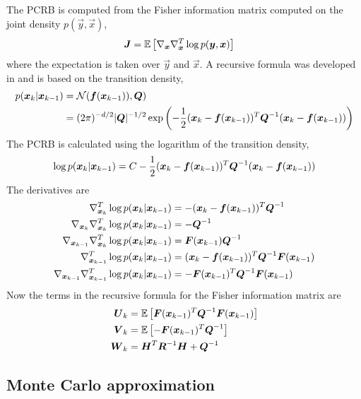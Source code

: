 \documentclass{article}
\begin{document}
The PCRB is computed from the Fisher information matrix computed on the joint density $p(\vec y,\vec x)$,
\begin{align}
	\boldsymbol{J} &= \mathbb E\left[ \nabla_{{\boldsymbol x}}\nabla_{{\boldsymbol x}}^T \log p({\boldsymbol y},{\boldsymbol x}) \right]
\end{align}
where the expectation is taken over $\vec y$ and $\vec x$. A recursive formula was developed in \cite{Tichavsky1998} and is based on the transition density,
\begin{align}
	p({\boldsymbol x}_k|{\boldsymbol x}_{k-1}) &= \mathcal N({\boldsymbol f}({\boldsymbol x}_{k-1})),\boldsymbol{Q}) \\
	&= (2\pi)^{-d/2} |\boldsymbol{Q}|^{-1/2} \exp\left(-\frac{1}{2}({\boldsymbol x}_k - {\boldsymbol f}({\boldsymbol x}_{k-1}))^T \boldsymbol{Q}^{-1} ({\boldsymbol x}_k - {\boldsymbol f}({\boldsymbol x}_{k-1})) \right)
\end{align}
The PCRB is calculated using the logarithm of the transition density,
\begin{align}
	\log p({\boldsymbol x}_k|{\boldsymbol x}_{k-1}) = C -\frac{1}{2}({\boldsymbol x}_k - {\boldsymbol f}({\boldsymbol x}_{k-1}))^T \boldsymbol{Q}^{-1} ({\boldsymbol x}_k - {\boldsymbol f}({\boldsymbol x}_{k-1})) 
\end{align}
The derivatives are
\begin{align}
	\nabla_{{\boldsymbol x}_k}^T \log p({\boldsymbol x}_k|{\boldsymbol x}_{k-1}) &= -({\boldsymbol x}_k - {\boldsymbol f}({\boldsymbol x}_{k-1}))^T\boldsymbol{Q}^{-1}  \\
	\nabla_{{\boldsymbol x}_k}\nabla_{{\boldsymbol x}_k}^T \log p({\boldsymbol x}_k|{\boldsymbol x}_{k-1}) &= -\boldsymbol{Q}^{-1} \\
	\nabla_{{\boldsymbol x}_{k-1}}\nabla_{{\boldsymbol x}_k}^T \log p({\boldsymbol x}_k|{\boldsymbol x}_{k-1}) &= \boldsymbol{F}({\boldsymbol x}_{k-1})\boldsymbol{Q}^{-1} \\
	\nabla_{{\boldsymbol x}_{k-1}}^T \log p({\boldsymbol x}_k|{\boldsymbol x}_{k-1}) &= ({\boldsymbol x}_k - {\boldsymbol f}({\boldsymbol x}_{k-1}))^T\boldsymbol{Q}^{-1} \boldsymbol{F}({\boldsymbol x}_{k-1}) \\
	\nabla_{{\boldsymbol x}_{k-1}}\nabla_{{\boldsymbol x}_{k-1}}^T \log p({\boldsymbol x}_k|{\boldsymbol x}_{k-1}) &= -\boldsymbol{F}({\boldsymbol x}_{k-1})^T\boldsymbol{Q}^{-1} \boldsymbol{F}({\boldsymbol x}_{k-1}) 
\end{align}
Now the terms in the recursive formula for the Fisher information matrix are
\begin{align}
	 \boldsymbol{U}_k &= \mathbb E\left[ \boldsymbol{F}({\boldsymbol x}_{k-1})^T\boldsymbol{Q}^{-1} \boldsymbol{F}({\boldsymbol x}_{k-1}) \right ] \label{eqn:pcrb_u} \\
	\boldsymbol{V}_k &= \mathbb E\left[ -\boldsymbol{F}({\boldsymbol x}_{k-1})^T\boldsymbol{Q}^{-1} \right ] \label{eqn:pcrb_v} \\
	\boldsymbol{W}_k &= \boldsymbol{H}^T\boldsymbol{R}^{-1}\boldsymbol{H} + \boldsymbol{Q}^{-1}
\end{align}

\subsection{Monte Carlo approximation}
\end{document}
